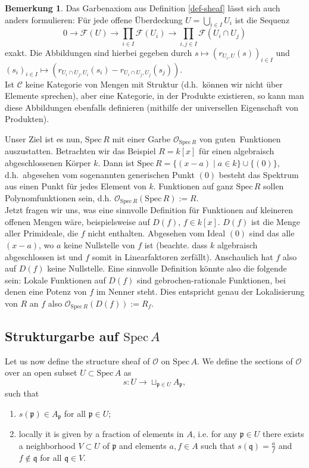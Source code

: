 \documentclass[reqno,12pt]{article}
\numberwithin{equation}{section}
\newcommand{\cC}{\mathcal{C}}
\newcommand{\cO}{\mathcal{O}}
\newcommand{\Spec}{\text{Spec}\,}
\theoremstyle{plain}
\theoremstyle{definition}
\newtheorem{remark}[thm]{Bemerkung}
\newcommand{\fp}{\mathfrak{p}}
\newcommand{\fq}{\mathfrak{q}}
\begin{document}
\begin{remark}
Das Garbenaxiom aus Definition \ref{def-sheaf} lässt sich auch anders formulieren:
Für jede offene Überdeckung $U=\bigcup_{i\in I}U_i$ ist die Sequenz
$$0\longrightarrow \mathcal{F}(U)\longrightarrow \prod_{i \in I}\mathcal{F}(U_i)\longrightarrow \prod_{i,j \in I} \mathcal{F}(U_i\cap U_j)$$
exakt.
Die Abbildungen sind hierbei gegeben durch $s\mapsto (r_{U_i,U}(s))_{i\in I}$ und $(s_i)_{i\in I}\mapsto (r_{U_i\cap U_j,U_i}(s_i)-r_{U_i\cap U_j,U_j}(s_j))$.\\ Ist $\cC$ keine Kategorie von Mengen mit Struktur (d.h.\ können wir nicht über Elemente sprechen), aber eine Kategorie, in der Produkte existieren, so kann man diese Abbildungen ebenfalls definieren (mithilfe der universellen Eigenschaft von Produkten).
\end{remark}

Unser Ziel ist es nun, $\Spec R$ mit einer Garbe $\mathcal{O}_{\Spec R}$ von \glqq guten\grqq\, Funktionen auszustatten. Betrachten wir das Beispiel $R=k[x]$ für einen algebraisch abgeschlossenen Körper $k$. Dann ist $\Spec R=\{ (x-a)\mid a\in k \}\cup \{ (0) \}$, d.h.\ abgesehen vom sogenannten generischen Punkt $(0)$ besteht das Spektrum aus einen Punkt für jedes Element von $k$. Funktionen auf ganz $\Spec R$ sollen Polynomfunktionen sein, d.h. $\mathcal{O}_{\Spec R}(\Spec R):=R$.\\ Jetzt fragen wir uns, was eine sinnvolle Definition für Funktionen auf kleineren offenen Mengen wäre, beispielsweise auf $D(f)$, $f\in k[x]$. $D(f)$ ist die Menge aller Primideale, die $f$ nicht enthalten. Abgesehen vom Ideal $(0)$ sind das alle $(x-a)$, wo $a$ keine Nullstelle von $f$ ist (beachte. dass $k$ algebraisch abgeschlossen ist und $f$ somit in Linearfaktoren zerfällt). Anschaulich hat $f$ also auf $D(f)$ keine Nullstelle. Eine sinnvolle Definition könnte also die folgende sein: Lokale Funktionen auf $D(f)$ sind gebrochen-rationale Funktionen, bei denen eine Potenz von $f$ im Nenner steht. Dies entspricht genau der Lokalisierung von $R$ an $f$ also $\mathcal{O}_{\Spec R}(D(f)):=R_f$.


\subsection{Strukturgarbe auf $\Spec A$}

Let us now define the structure sheaf of $\cO$ on $\Spec A$.
We define the sections of $\cO$ over an open subset $U \subset \Spec A$ as
\begin{equation*}
  s \colon U \to \sqcup_{\fp \in U} A_{\fp},
\end{equation*}
such that
\begin{enumerate}
  \item $s(\fp) \in A_{\fp}$ for all $\fp \in U$;
  \item locally it is given by a fraction of elements in $A$, i.e. for any $\fp \in U$
  there exists a neighborhood $V \subset U$ of $\fp$ and elements $a,f \in A$
  such that $s(\fq) = \frac{a}{f}$ and $f \notin \fq$ for all $\fq \in V$.
\end{enumerate}
\end{document}
